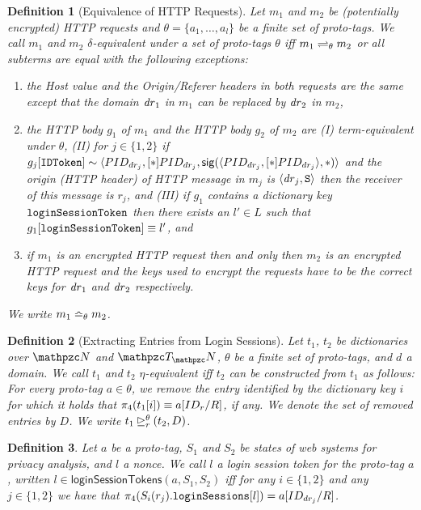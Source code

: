 \documentclass[letterpaper,onecolumn,10pt]{article}
\newtheorem{definition}{Definition}
\begin{document}
\begin{definition}[Equivalence of HTTP Requests]
  Let $m_1$ and $m_2$ be (potentially encrypted) HTTP requests and
  $\theta = \{a_1, \ldots, a_l \}$ be a finite set of proto-tags. 
  We call $m_1$ and $m_2$ \emph{$\delta$-equivalent under a set of proto-tags $\theta$} 
  iff $m_1 \prototagequiv{\theta} m_2$ or all subterms are equal with the following exceptions:
  \begin{enumerate}
  \item the Host value and the Origin/Referer headers in both requests
    are the same except that the domain $\mi{dr}_1$ in $m_1$ can be
    replaced by $\mi{dr}_2$ in $m_2$,
  \item the HTTP body $g_1$ of $m_1$ and the HTTP body $g_2$ of $m_2$
    are (I) term-equivalent under $\theta$, (II) for $j\in \{1,2\}$ if
    $g_j[\str{IDToken}] \sim \myangle{PID_{dr_j}, [*]PID_{dr_j}, 
    \sig{\myangle{PID_{dr_j}, [*]PID_{dr_j}}}{*}}$
    and the origin (HTTP header) of HTTP message in $m_j$ is
    $\an{\mi{dr}_j,\https}$ then the receiver of this message is
    $r_j$, and (III) if $g_1$ contains a dictionary key
    $\str{loginSessionToken}$ then there exists an $l' \in L$ such
    that $g_1[\str{loginSessionToken}] \equiv l'$, and
  \item if $m_1$ is an encrypted HTTP request then and only then $m_2$
    is an encrypted HTTP request and the keys used to encrypt the
    requests have to be the correct keys for $\mi{dr}_1$ and
    $\mi{dr}_2$ respectively.
  \end{enumerate}
  We write $m_1 \httptagequiv{\theta} m_2$.
\end{definition}

\begin{definition}[Extracting Entries from Login Sessions]
  Let $t_1$, $t_2$ be dictionaries over $\nonces$ and $\terms$,
  $\theta$ be a finite set of proto-tags, and $d$ a domain. We call
  $t_1$ and $t_2$ \emph{$\eta$-equivalent} iff $t_2$ can be
  constructed from $t_1$ as follows: For every proto-tag
  $a \in \theta$, we remove the entry identified by the dictionary key
  $i$ for which it holds that $\proj{4}{t_1[i]} \equiv a[ID_r/ R]$, if
  any. We denote the set of removed entries by $D$. We write
  $\logsessminus{t_1}{t_2}{\theta}{r}{D}$.
\end{definition}

\begin{definition}
  Let $a$ be a proto-tag, $S_1$ and $S_2$ be states of \uppresso web
  systems for privacy analysis, and $l$ a nonce. We call $l$ a login
  session token for the proto-tag $a$, written
  $l \in \mathsf{loginSessionTokens}(a,S_1,S_2)$ iff for any
  $i \in \{1,2\}$ and any $j \in \{1,2\}$ we have that
  $\proj{4}{S_i(r_j).\str{loginSessions}[l]} = a[ID_{dr_j}/ R]$.
\end{definition}
\end{document}
